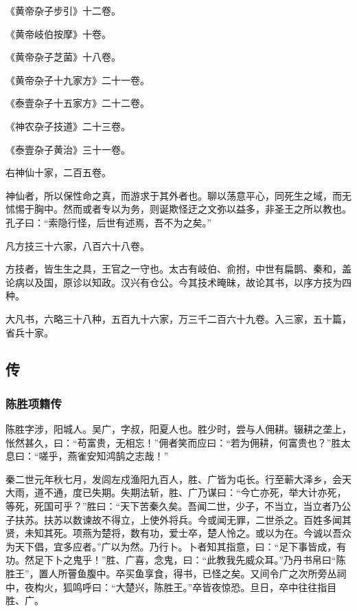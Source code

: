 \documentclass[]{article}
\begin{document}
《黄帝杂子步引》十二卷。

《黄帝岐伯按摩》十卷。

《黄帝杂子芝菌》十八卷。

《黄帝杂子十九家方》二十一卷。

《泰壹杂子十五家方》二十二卷。

《神农杂子技道》二十三卷。

《泰壹杂子黄治》三十一卷。

右神仙十家，二百五卷。

神仙者，所以保性命之真，而游求于其外者也。聊以荡意平心，同死生之域，而无怵惕于胸中。然而或者专以为务，则诞欺怪迂之文弥以益多，非圣王之所以教也。孔子曰：``索隐行怪，后世有述焉，吾不为之矣。''

凡方技三十六家，八百六十八卷。

方技者，皆生生之具，王官之一守也。太古有岐伯、俞拊，中世有扁鹊、秦和，盖论病以及国，原诊以知政。汉兴有仓公。今其技术晻昧，故论其书，以序方技为四种。

大凡书，六略三十八种，五百九十六家，万三千二百六十九卷。入三家，五十篇，省兵十家。

\hypertarget{header-n3415}{%
\subsection{传}\label{header-n3415}}

\hypertarget{header-n3416}{%
\subsubsection{陈胜项籍传}\label{header-n3416}}

陈胜字涉，阳城人。吴广，字叔，阳夏人也。胜少时，尝与人佣耕。辍耕之垄上，怅然甚久，曰：``苟富贵，无相忘！''佣者笑而应曰：``若为佣耕，何富贵也？''胜太息曰：``嗟乎，燕雀安知鸿鹄之志哉！''

秦二世元年秋七月，发闾左戍渔阳九百人，胜、广皆为屯长。行至蕲大泽乡，会天大雨，道不通，度已失期。失期法斩，胜、广乃谋曰：``今亡亦死，举大计亦死，等死，死国可乎？''胜曰：``天下苦秦久矣。吾闻二世，少子，不当立，当立者乃公子扶苏。扶苏以数谏故不得立，上使外将兵。今或闻无罪，二世杀之。百姓多闻其贤，未知其死。项燕为楚将，数有功，爱士卒，楚人怜之。或以为在。今诚以吾众为天下倡，宜多应者。''广以为然。乃行卜。卜者知其指意，曰：``足下事皆成，有功。然足下卜之鬼乎！''胜、广喜，念鬼，曰：``此教我先威众耳。''乃丹书帛曰``陈胜王''，置人所罾鱼腹中。卒买鱼享食，得书，已怪之矣。又间令广之次所旁丛祠中，夜构火，狐鸣呼曰：``大楚兴，陈胜王。''卒皆夜惊恐。旦日，卒中往往指目胜、广。
\end{document}
